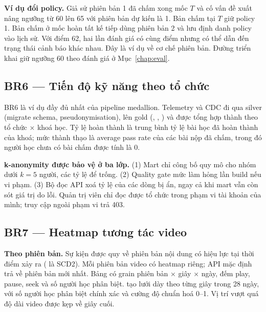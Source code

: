 \textbf{Ví dụ đổi policy.} Giả sử phiên bản 1 đã chấm xong mốc $T$ và cố vấn đề xuất nâng ngưỡng từ 60 lên 65 với phiên bản dự kiến là 1. Bản chấm tại $T$ giữ policy 1. Bản chấm ở mốc hoàn tất kế tiếp dùng phiên bản 2 và lưu định danh policy vào lịch sử. Với điểm 62, hai lần đánh giá có cùng điểm nhưng có thể dẫn đến trạng thái cảnh báo khác nhau. Đây là ví dụ về cơ chế phiên bản. Đường triển khai giữ ngưỡng 60 theo đánh giá ở Mục~\ref{chap:eval}.

\subsection{BR6 --- Tiến độ kỹ năng theo tổ chức}

BR6 là ví dụ đầy đủ nhất của pipeline medallion. Telemetry và CDC đi qua silver (migrate schema, pseudonymisation), lên gold (, , ) và được tổng hợp thành  theo tổ chức × khoá học. Tỷ lệ hoàn thành là trung bình tỷ lệ bài học đã hoàn thành của khoá; mức thành thạo là average pass rate của các bài nộp đã chấm, trong đó người học chưa có bài chấm được tính là 0.

\textbf{k-anonymity được bảo vệ ở ba lớp.} (1) Mart chỉ công bố quy mô cho nhóm dưới $k = 5$ người, các tỷ lệ để trống. (2) Quality gate mức   làm hỏng lần build nếu vi phạm. (3) Bộ đọc API xoá tỷ lệ của các dòng bị ẩn, ngay cả khi mart vẫn còn sót giá trị do lỗi. Quản trị viên chỉ đọc được tổ chức trong phạm vi tài khoản của mình; truy cập ngoài phạm vi trả 403.

\subsection{BR7 --- Heatmap tương tác video}

\textbf{Theo phiên bản.} Sự kiện được quy về phiên bản nội dung có hiệu lực tại thời điểm xảy ra ( là SCD2). Mỗi phiên bản video có heatmap riêng; API mặc định trả về phiên bản mới nhất. Bảng  có grain phiên bản × giây × ngày, đếm play, pause, seek và số người học phân biệt.  tạo lưới dày theo từng giây trong 28 ngày, với số người học phân biệt chính xác và cường độ chuẩn hoá 0--1. Vị trí vượt quá độ dài video được kẹp về giây cuối.

